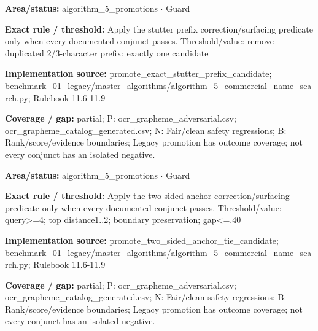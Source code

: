 \begin{tcolorbox}[enhanced,breakable,colback=white,colframe=Muted!45,boxrule=0.45pt,arc=1.5pt,left=6pt,right=6pt,top=5pt,bottom=5pt,title={\texttt{A5-PROMOTE-STUTTER-PREFIX}},title after break={\texttt{A5-PROMOTE-STUTTER-PREFIX}\ (continued)},fonttitle=\headingfont\bfseries\color{Navy},coltitle=Navy]
\textbf{Area/status:} algorithm\_\allowbreak{}5\_\allowbreak{}promotions $\boldsymbol{\cdot}$ Guard\par
\smallskip
\textbf{Exact rule / threshold:} Apply the stutter prefix correction/\allowbreak{}surfacing predicate only when every documented conjunct passes. Threshold/\allowbreak{}value: remove duplicated 2/\allowbreak{}3-character prefix; exactly one candidate\par
\smallskip
\textbf{Implementation source:} promote\_\allowbreak{}exact\_\allowbreak{}stutter\_\allowbreak{}prefix\_\allowbreak{}candidate; benchmark\_\allowbreak{}01\_\allowbreak{}legacy/\allowbreak{}master\_\allowbreak{}algorithms/\allowbreak{}algorithm\_\allowbreak{}5\_\allowbreak{}commercial\_\allowbreak{}name\_\allowbreak{}search.py; Rulebook 11.6-11.9\par
\smallskip
\textbf{Coverage / gap:} partial; P: ocr\_\allowbreak{}grapheme\_\allowbreak{}adversarial.csv; ocr\_\allowbreak{}grapheme\_\allowbreak{}catalog\_\allowbreak{}generated.csv; N: Fair/\allowbreak{}clean safety regressions; B: Rank/\allowbreak{}score/\allowbreak{}evidence boundaries; Legacy promotion has outcome coverage; not every conjunct has an isolated negative.
\end{tcolorbox}
\begin{tcolorbox}[enhanced,breakable,colback=white,colframe=Muted!45,boxrule=0.45pt,arc=1.5pt,left=6pt,right=6pt,top=5pt,bottom=5pt,title={\texttt{A5-PROMOTE-TWO-SIDED-ANCHOR}},title after break={\texttt{A5-PROMOTE-TWO-SIDED-ANCHOR}\ (continued)},fonttitle=\headingfont\bfseries\color{Navy},coltitle=Navy]
\textbf{Area/status:} algorithm\_\allowbreak{}5\_\allowbreak{}promotions $\boldsymbol{\cdot}$ Guard\par
\smallskip
\textbf{Exact rule / threshold:} Apply the two sided anchor correction/\allowbreak{}surfacing predicate only when every documented conjunct passes. Threshold/\allowbreak{}value: query>=4; top distance1..2; boundary preservation; gap<=.40\par
\smallskip
\textbf{Implementation source:} promote\_\allowbreak{}two\_\allowbreak{}sided\_\allowbreak{}anchor\_\allowbreak{}tie\_\allowbreak{}candidate; benchmark\_\allowbreak{}01\_\allowbreak{}legacy/\allowbreak{}master\_\allowbreak{}algorithms/\allowbreak{}algorithm\_\allowbreak{}5\_\allowbreak{}commercial\_\allowbreak{}name\_\allowbreak{}search.py; Rulebook 11.6-11.9\par
\smallskip
\textbf{Coverage / gap:} partial; P: ocr\_\allowbreak{}grapheme\_\allowbreak{}adversarial.csv; ocr\_\allowbreak{}grapheme\_\allowbreak{}catalog\_\allowbreak{}generated.csv; N: Fair/\allowbreak{}clean safety regressions; B: Rank/\allowbreak{}score/\allowbreak{}evidence boundaries; Legacy promotion has outcome coverage; not every conjunct has an isolated negative.
\end{tcolorbox}
